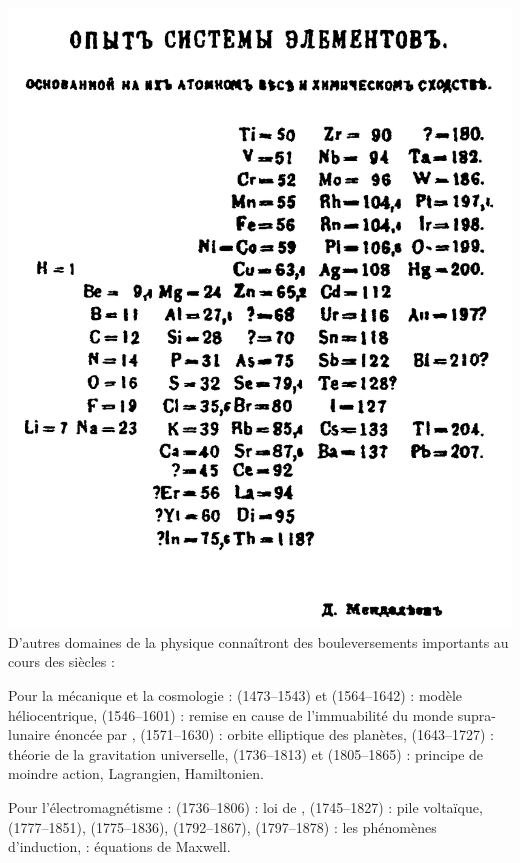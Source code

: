 \marginpar
{
	\vspace{2cm}
	\includegraphics[width=\marginparwidth]{SM/periodique.png}
    \label{periodique}
}
D'autres domaines de la physique connaîtront des bouleversements importants au cours des siècles : 

Pour la mécanique et la cosmologie :  (\num{1473}--\num{1543}) et  (\num{1564}--\num{1642}) : modèle héliocentrique,  (\num{1546}--\num{1601}) : remise en cause de  l'immuabilité du monde supra-lunaire énoncée par ,  (\num{1571}--\num{1630}) : orbite elliptique des planètes,  (\num{1643}--\num{1727}) : théorie de la gravitation universelle,  \hbox{(\num{1736}--\num{1813})} et  (\num{1805}--\num{1865}) : principe de moindre action, Lagrangien, Hamiltonien.

Pour l'électromagnétisme :  (\num{1736}--\num{1806}) : loi de ,  (\num{1745}--\num{1827}) : pile voltaïque,  (\num{1777}--\num{1851}),  (\num{1775}--\num{1836}),  (\num{1792}--\num{1867}),  (\num{1797}--\num{1878}) : les phénomènes d'induction,  : équations de Maxwell.

